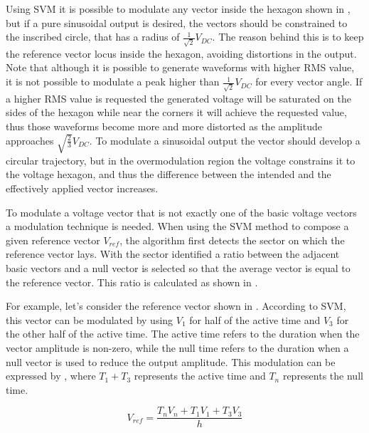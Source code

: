 \documentclass[9pt,conference]{IEEEtran}
\begin{document}
Using SVM it is possible to modulate any vector inside the hexagon shown in , but if a pure sinusoidal output is desired, the vectors should be constrained to the inscribed circle, that has a radius of $\frac{1}{\sqrt{2}} V_{DC}$. The reason behind this is to keep the reference vector locus inside the hexagon, avoiding distortions in the output. Note that although it is possible to generate waveforms with higher RMS value, it is not possible to modulate a peak higher than $\frac{1}{\sqrt{2}} V_{DC}$ for every vector angle. If a higher RMS value is requested the generated voltage will be saturated on the sides of the hexagon while near the corners it will achieve the requested value, thus those waveforms become more and more distorted as the amplitude approaches $\sqrt{\frac{2}{3}} V_{DC}$. To modulate a sinusoidal output the vector should develop a circular trajectory, but in the overmodulation region the voltage constrains it to the voltage hexagon, and thus the difference between the intended and the effectively applied vector increases.

To modulate a voltage vector that is not exactly one of the basic voltage vectors a modulation technique is needed. When using the SVM method to compose a given reference vector $V_{ref}$, the algorithm first detects the sector on which the reference vector lays. With the sector identified a ratio between the adjacent basic vectors and a null vector is selected so that the average vector is equal to the reference vector. This ratio is calculated as shown in .

For example, let's consider the reference vector shown in . According to SVM, this vector can be modulated by using $V_1$ for half of the active time and $V_3$ for the other half of the active time. The active time refers to the duration when the vector amplitude is non-zero, while the null time refers to the duration when a null vector is used to reduce the output amplitude. This modulation can be expressed by , where $T_1+T_3$ represents the active time and $T_{n}$ represents the null time.

\begin{equation}
	V_{ref} = \frac{T_{n} V_{n} + T_1 V_1  + T_3 V_3}{h}
	\label{eq:svm_vref}
\end{equation}

\end{document}
